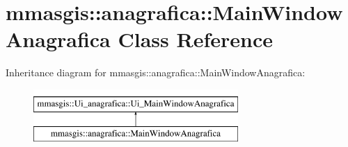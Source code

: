 \hypertarget{classmmasgis_1_1anagrafica_1_1MainWindowAnagrafica}{
\section{mmasgis::anagrafica::MainWindowAnagrafica Class Reference}
\label{classmmasgis_1_1anagrafica_1_1MainWindowAnagrafica}
}
Inheritance diagram for mmasgis::anagrafica::MainWindowAnagrafica:\begin{figure}[H]
\begin{center}
\leavevmode
\includegraphics[height=2.000000cm]{classmmasgis_1_1anagrafica_1_1MainWindowAnagrafica}
\end{center}
\end{figure}
